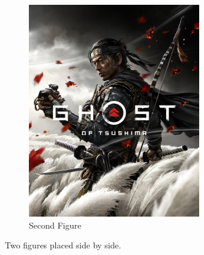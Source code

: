 \documentclass[a4paper, 12pt]{article}
\begin{document}
\begin{figure}[h!]
\begin{subfigure}[b]{0.45\textwidth}
\includegraphics[width=\textwidth]{Ghost2.jpg} %
\caption{Second Figure}
\label{fig:fig2}
\end{subfigure}
\caption{Two figures placed side by side.}
\label{fig:sidebyside}
\end{figure}
\end{document}
